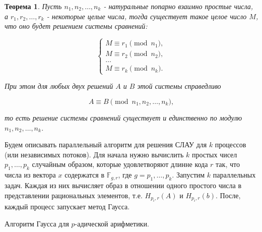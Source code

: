 \documentclass[master, och, diploma, times]{sty/SCWorks}
\theoremstyle{plain}
\newtheorem{thethm}{Теорема}[section]
\theoremstyle{definition}
\begin{document}
\begin{thethm}
Пусть $n_1,n_2,\dots, n_k$ - натуральные попарно взаимно простые числа, а $r_1,r_2,\dots,r_k$ - некоторые целые числа, тогда существует такое целое число $M$, что оно будет решением системы сравнений:

$$
\begin{cases} 
M \equiv r_1 \pmod {n_1}, \\
M \equiv r_2 \pmod {n_2}, \\
\dots \\
M \equiv r_k \pmod {n_k}.
\end{cases}
$$

\noindent При этом для любых двух решений $A$ и $B$ этой системы справедливо

$$
A \equiv B \pmod {n_1,n_2,\dots,n_k},
$$

\noindent то есть решение системы сравнений существует и единственно по модулю $n_1,n_2,\dots,n_k$.
\end{thethm}


Будем описывать параллельный алгоритм для решения СЛАУ для $k$ процессов (или независимых потоков). Для начала нужно вычислить $k$ простых чисел $p_1, \dots, p_k$ случайным образом, которые удовлетворяют длинне кода $r$ так, что числа из вектора $x$ содержатся в $\mathbb{F}_{g,r}$, где $g=p_1,\dots,p_k$. 
Запустим $k$ параллельных задач. Каждая из них вычисляет образ в отношении одного простого числа в представлении рациональных элементов, т.е. $H_{p_i,r}(A)$ и $H_{p_i,r}(b)$.
После, каждый процесс запускает метод Гаусса.

\begin{algorithm}
\DontPrintSemicolon %





\caption{Алгоритм Гаусса для $p$-адической арифметики.}
\label{algo:gauss}
\end{algorithm}
\end{document}
